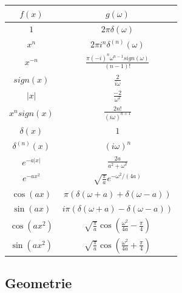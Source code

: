 \documentclass[12pt,a4paper, twoside]{article}
\newcommand{\abs}[1]{\left| #1 \right|}
\renewcommand{\=}[1]{\stackrel{#1}{=}}
\theoremstyle{definition}
\theoremstyle{remark}
\begin{document}
\noindent\begin{tabular}{cc}
$f(x)$ & $g(\omega)$\\
\midrule
$1$ & $2 \pi \delta(\omega)$\\
$x^n$ & $2\pi i^n \delta^{(n)}(\omega)$\\
$x^{-n}$ & $\frac{\pi(-i)^n \omega^{n-1} sign(\omega)}{(n-1)!}$\\
$sign(x)$ & $\frac{2}{i\omega}$\\
$\abs{x}$ & $\frac{-2}{\omega^2}$\\
$x^n sign(x)$ & $\frac{2n!}{(i\omega)^{n+1}}$\\
$\delta(x)$ & $1$\\
$\delta^{(n)}(x)$ & $(i\omega)^n$\\
$e^{-a\abs{x}}$ & $\frac{2a}{a^2 + \omega^2}$\\
$e^{-ax^2}$ & $\sqrt{\frac{\pi}{a}} e^{-\omega^2 / (4a)}$\\
$\cos(ax)$ & $\pi (\delta(\omega+a) + \delta(\omega-a))$\\
$\sin(ax)$ & $i\pi (\delta(\omega+a) - \delta(\omega-a))$\\
$\cos(ax^2)$ & $\sqrt{\frac{\pi}{a}} \cos(\frac{\omega^2}{4a} - \frac{\pi}{4})$\\
$\sin(ax^2)$ & $\sqrt{\frac{\pi}{a}} \cos(\frac{\omega^2}{4a} + \frac{\pi}{4})$
\end{tabular}





\subsection{Geometrie}
\end{document}
